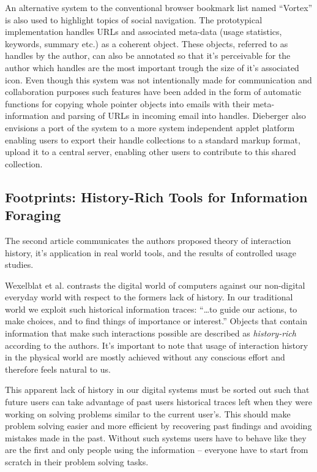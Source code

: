 \documentclass[12pt,a4paper]{article}
\begin{document}
An alternative system to the conventional browser bookmark list
named ``Vortex'' is also used to highlight topics of social navigation. The
prototypical implementation handles URLs and associated meta-data (usage
statistics, keywords, summary etc.) as a coherent object. These objects,
referred to as handles by the author, can also be annotated so that it's
perceivable for the author which handles are the most important trough the
size of it's associated icon. Even though this system was not intentionally
made for communication and collaboration purposes such features have been
added in the form of automatic functions for copying whole pointer objects
into emails with their meta-information and parsing of URLs in incoming email
into handles. Dieberger also envisions a port of the system to a more system
independent applet platform enabling users to export their handle collections
to a standard markup format, upload it to a central server, enabling other
users to contribute to this shared collection.

\subsection{Footprints: History-Rich Tools for Information Foraging}

The second article \cite{wexelblat99} communicates the authors proposed theory
of interaction history, it's application in real world tools, and the results
of controlled usage studies. 

Wexelblat et al. contrasts the digital world of computers against our
non-digital everyday world with respect to the formers lack of history. In our
traditional world we exploit such historical information traces:
``\ldots to guide our actions, to make choices, and to find things of
importance or interest.'' \cite{wexelblat99}
Objects that contain information that make such interactions possible are
described as \emph{history-rich} according to the authors. It's important to
note that usage of interaction history in the physical world are mostly
achieved without any conscious effort and therefore feels natural to us.

This apparent lack of history in our digital systems must be sorted out such
that future users can take advantage of past users historical traces left when
they were working on solving problems similar to the current user's. This
should make problem solving easier and more efficient by recovering past
findings and avoiding mistakes made in the past. Without such systems users
have to behave like they are the first and only people using the information
-- everyone have to start from scratch in their problem solving tasks.
\end{document}
